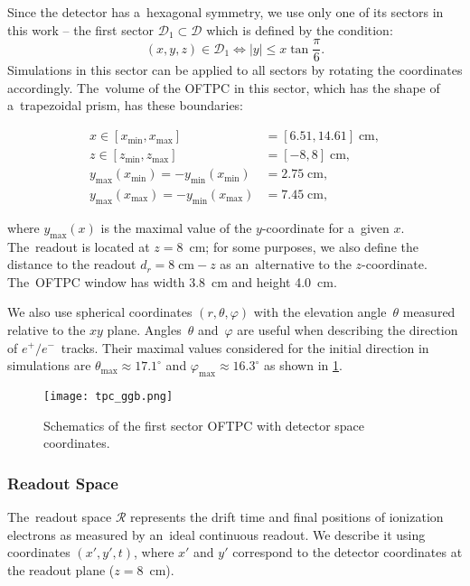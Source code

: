 				Since the detector has a~hexagonal symmetry, we use only one of its sectors in this work -- the first sector $\mathcal{D}_1 \subset \mathcal{D}$ which is defined by the condition:
					\begin{equation}
						(x,y,z) \in \mathcal{D}_1 \Leftrightarrow |y| \leq x\tan \frac{\pi}{6}.
					\end{equation}
				Simulations in this sector can be applied to all sectors by rotating the coordinates accordingly. The~volume of the \ac{OFTPC} in this sector, which has the shape of a~trapezoidal prism, has these boundaries:
					\begin{linenomath}
						\begin{align}
							x \in [x_\text{min},x_\text{max}] &= [6.51, 14.61] \;\text{cm},\\
							z \in [z_\text{min},z_\text{max}] &= [-8,8] \;\text{cm},\\
							y_\text{max}(x_\text{min}) = -y_\text{min}(x_\text{min}) &=  2.75\;\text{cm},\\
							y_\text{max}(x_\text{max}) = -y_\text{min}(x_\text{max}) &=  7.45\;\text{cm},
						\end{align}
					\end{linenomath}
				where $y_\text{max}(x)$ is the maximal value of the $y$-coordinate for a~given $x$. The~readout is located at $z = 8$~cm; for some purposes, we also define the distance to the readout $d_r = 8\;\text{cm}-z$ as an~alternative to the $z$-coordinate. The~\ac{OFTPC} window has width 3.8~cm and height 4.0~cm.
				
				We also use spherical coordinates $(r,\theta,\varphi)$ with the elevation angle~$\theta$ measured relative to the $xy$ plane. Angles~$\theta$ and~$\varphi$ are useful when describing the direction of $e^+/e^-$~tracks. Their maximal values considered for the initial direction in simulations are $\theta_\text{max} \approx 17.1^\circ$ and $\varphi_\text{max} \approx 16.3^\circ$ as shown in \cref{fig:oftpc}.
				
				\begin{figure}
					\centering
					\texttt{[image: tpc\_ggb.png]}
					\caption{Schematics of the first sector \ac{OFTPC} with detector space coordinates.}
					\label{fig:oftpc}
				\end{figure}
			
			\subsubsection{Readout Space}
				The~readout space $\mathcal{R}$ represents the drift time and final positions of ionization electrons as measured by an~ideal continuous readout. We describe it using coordinates $(x',y',t)$, where $x'$ and $y'$ correspond to the detector coordinates at the readout plane ($z = 8$~cm).
				
